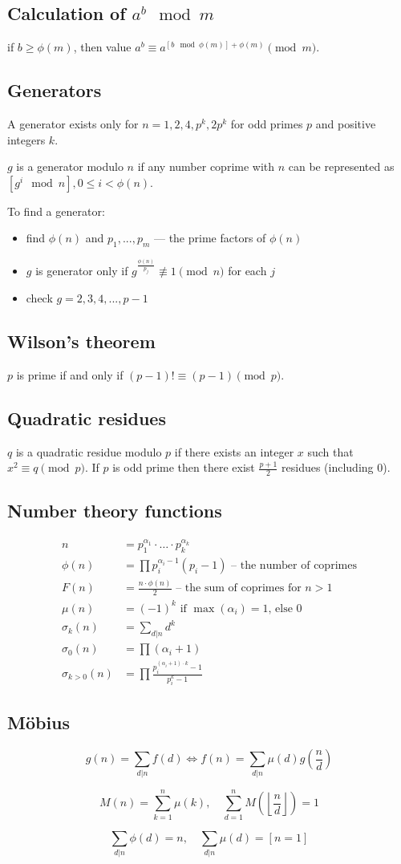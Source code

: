 \subsection*{Calculation of $a^b \mod m$}
if $b \ge \phi(m)$, then value $a^b \equiv a^{\left[b \mod \phi(m)\right] + \phi(m)} \pmod m$.

\subsection*{Generators}
A generator exists only for $n = 1, 2, 4, p^k, 2p^k$ for odd primes $p$ and positive integers $k$. 

$g$ is a generator modulo $n$ if any number coprime with $n$ can be represented as $\left[ g^i \mod n \right], 0 \le i < \phi(n)$.

To find a generator:
\begin{itemize}
\item find $\phi(n)$ and $p_1, ..., p_m$ --- the prime factors of $\phi(n)$
\item $g$ is generator only if $g^{\frac{\phi(n)}{p_j}} \not\equiv 1 \pmod n$ for each $j$
\item check $g = 2, 3, 4, ..., p - 1$
\end{itemize}

\subsection*{Wilson's theorem}
$p$ is prime if and only if $(p - 1)! \equiv (p - 1) \pmod p$.

\subsection*{Quadratic residues}
$q$ is a quadratic residue modulo $p$ if there exists an integer $x$ such that $x^2 \equiv q \pmod p$.
If $p$ is odd prime then there exist $\frac{p + 1}{2}$ residues (including 0).

\subsection*{Number theory functions}
\begin{align*}
n &= p_1^{\alpha_1} \cdot \dots \cdot p_k^{\alpha_k}\\
\phi(n) &= \prod p_i^{\alpha_i - 1} (p_i - 1) \text{ – the number of coprimes}\\
F(n) &= \frac{n \cdot \phi(n)}{2} \text{ – the sum of coprimes for } n > 1\\
\mu(n) &= (-1)^k \text{ if } \max(\alpha_i) = 1 \text {, else } 0\\
\sigma_k(n) &= \sum_{d|n} d^k\\
\sigma_0(n) &= \prod (\alpha_i + 1)\\
\sigma_{k > 0}(n) &= \prod \frac{p_i^{(\alpha_i + 1) \cdot k} - 1}{p_i^k - 1} 
\end{align*}

\subsection*{Möbius}
$$g(n) = \sum_{d|n}f(d) \iff f(n) = \sum_{d|n}\mu(d)g\left(\frac{n}{d}\right)$$

$$M(n) = \sum_{k=1}^{n}\mu(k), \quad \sum_{d = 1}^{n} M\left(\left\lfloor\frac{n}{d}\right\rfloor\right) = 1$$

$$\sum_{d|n} \phi(d) = n, \quad \sum_{d|n} \mu(d) = [n = 1]$$
